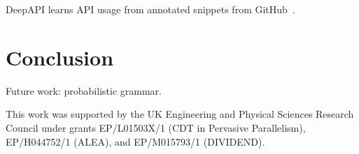 \documentclass[preprint,nonatbib,10pt,nocopyrightspace]{sigplanconf}
\begin{document}
DeepAPI learns API usage from annotated snippets from
GitHub~\cite{Zhang2015a}.


\section{Conclusion}\label{sec:conclusion}

Future work: probabilistic grammar.


\acks

This work was supported by the UK Engineering and Physical Sciences
Research Council under grants EP/L01503X/1 (CDT in Pervasive
Parallelism), EP/H044752/1 (ALEA), and EP/M015793/1 (DIVIDEND).

\label{bibliography}
\printbibliography
\end{document}
